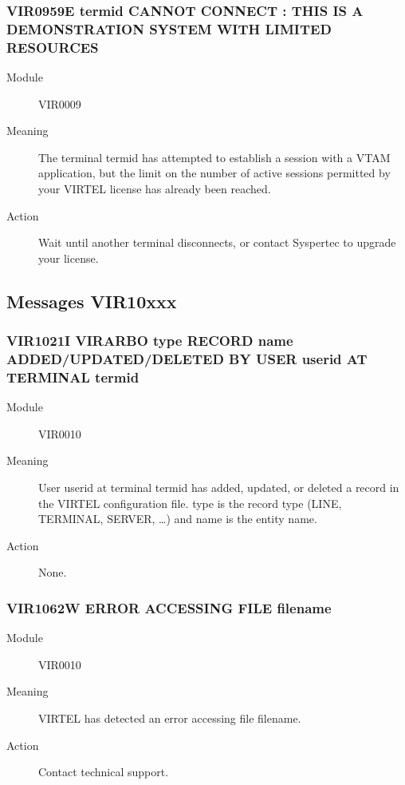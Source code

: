 \documentclass[letterpaper,10pt,english]{sphinxmanual}
\begin{document}
\subsubsection{VIR0959E termid CANNOT CONNECT : THIS IS A DEMONSTRATION SYSTEM WITH LIMITED RESOURCES}
\label{\detokenize{messages:vir0959e-termid-cannot-connect-this-is-a-demonstration-system-with-limited-resources}}\begin{description}
\item[{Module}] \leavevmode
VIR0009

\item[{Meaning}] \leavevmode
The terminal termid has attempted to establish a session with a VTAM application, but the limit on the number of active sessions permitted by your VIRTEL license has already been reached.

\item[{Action}] \leavevmode
Wait until another terminal disconnects, or contact Syspertec to upgrade your license.

\end{description}


\subsection{Messages VIR10xxx}
\label{\detokenize{messages:messages-vir10xxx}}

\subsubsection{VIR1021I VIRARBO type RECORD name ADDED/UPDATED/DELETED BY USER userid AT TERMINAL termid}
\label{\detokenize{messages:vir1021i-virarbo-type-record-name-added-updated-deleted-by-user-userid-at-terminal-termid}}\begin{description}
\item[{Module}] \leavevmode
VIR0010

\item[{Meaning}] \leavevmode
User userid at terminal termid has added, updated, or deleted a record in the VIRTEL configuration file. type is the record type (LINE, TERMINAL, SERVER, …) and name is the entity name.

\item[{Action}] \leavevmode
None.

\end{description}


\subsubsection{VIR1062W ERROR ACCESSING FILE filename}
\label{\detokenize{messages:vir1062w-error-accessing-file-filename}}\begin{description}
\item[{Module}] \leavevmode
VIR0010

\item[{Meaning}] \leavevmode
VIRTEL has detected an error accessing file filename.

\item[{Action}] \leavevmode
Contact technical support.

\end{description}
\end{document}
